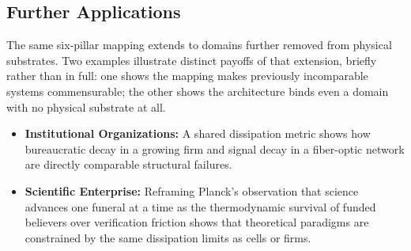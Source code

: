 \subsection{Further Applications}
\label{sec:further-applications}
The same six-pillar mapping extends to domains further removed from physical substrates. Two examples illustrate distinct payoffs of that extension, briefly rather than in full: one shows the mapping makes previously incomparable systems commensurable; the other shows the architecture binds even a domain with no physical substrate at all.

\begin{itemize}
    \item \textbf{Institutional Organizations:} A shared dissipation metric shows how bureaucratic decay in a growing firm and signal decay in a fiber-optic network are directly comparable structural failures.
    \item \textbf{Scientific Enterprise:} Reframing Planck's observation that science advances one funeral at a time as the thermodynamic survival of funded believers over verification friction shows that theoretical paradigms are constrained by the same dissipation limits as cells or firms.
\end{itemize}